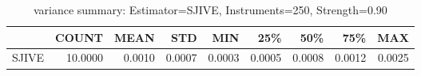 \begin{table}[ht]
\centering
\caption{variance summary: Estimator=SJIVE, Instruments=250, Strength=0.90}
\begin{tabular}{lrrrrrrrr}
\toprule
 & COUNT & MEAN & STD & MIN & 25\% & 50\% & 75\% & MAX \\
\midrule
SJIVE & 10.0000 & 0.0010 & 0.0007 & 0.0003 & 0.0005 & 0.0008 & 0.0012 & 0.0025 \\
\bottomrule
\end{tabular}
\end{table}
